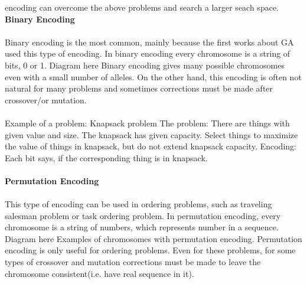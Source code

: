 \documentclass[a4paper, 12pt]{article}
\begin{document}
encoding can overcome the above problems and search a larger seach space.
\textbf{Binary Encoding}\\~\\
Binary encoding is the most common, mainly because the first works about GA used this type of encoding. In binary encoding every chromosome is
a string of bits, 0 or 1.
Diagram here
Binary encoding gives many possible chromosomes even with a small number of alleles. On the other hand, this encoding is often not natural for 
many problems and sometimes corrections must be made after crossover/or mutation.\\~\\
Example of a problem:  Knapsack problem
The problem:  There are things with given value and size. The knapsack has given capacity. Select things to maximize the value of things in 
knapsack, but do not extend knapsack capacity.
Encoding: Each bit says, if the corresponding thing is in knapsack.\\~\\
\textbf{Permutation Encoding}\\~\\
This type of encoding can be used in ordering problems, such as traveling salesman problem or task ordering problem. In permutation encoding,
every chromosome is a string of numbers, which represents number in a sequence.
Diagram here
Examples of chromosomes with permutation encoding.
Permutation encoding is only useful for ordering problems. Even for these problems, for some types of crossover and mutation corrections must
be made to leave the chromosome consistent(i.e. have real sequence in it).
\end{document}
